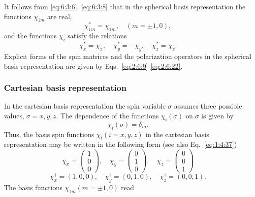 It follows from \eqref{eq:6:3:6}, \eqref{eq:6:3:8} that in the spherical basis representation the functions $\chi_{1 m}$ are real,
\begin{equation}
\chi_{1 m}^{*}=\chi_{1 m}, \quad(m= \pm 1,0), \label{eq:6:3:10}
\end{equation}
and the functions $\chi_{i}$ satisfy the relations
\begin{equation}
\chi_{x}^{*}=\chi_{x}, \quad \chi_{y}^{*}=-\chi_{y}, \quad \chi_{z}^{*}=\chi_{z} . \label{eq:6:3:11}
\end{equation}
Explicit forms of the spin matrices and the polarization operators in the spherical basis representation are given by Eqs.~\eqref{eq:2:6:9}-\eqref{eq:2:6:22}.

\subsubsection{Cartesian basis representation}
In the cartesian basis representation the spin variable $\sigma$ assumes three possible values, $\sigma=x, y, z$. The dependence of the functions $\chi_{i}(\sigma)$ on $\sigma$ is given by
\begin{equation}
\chi_{i}(\sigma)=\delta_{i \sigma} . \label{eq:6:3:12}
\end{equation}
Thus, the basis spin functions $\chi_{i}(i=x, y, z)$ in the cartesian basis representation may be written in the following form (see also Eq.~\eqref{eq:1:4:37})
\begin{equation}
\chi_{x}=\begin{pmatrix}
1 \\
0 \\
0
\end{pmatrix}, \quad \chi_{y}=\begin{pmatrix}
0 \\
1 \\
0
\end{pmatrix}, \quad \chi_{z}=\begin{pmatrix}
0 \\
0 \\
1
\end{pmatrix} \label{eq:6:3:13}
\end{equation}
\begin{equation}
\chi_{x}^{\dagger}=(1,0,0), \quad \chi_{y}^{\dagger}=(0,1,0), \quad \chi_{z}^{\dagger}=(0,0,1) . \label{eq:6:3:14}
\end{equation}
The basis functions $\chi_{1 m}(m= \pm 1,0)$ read
